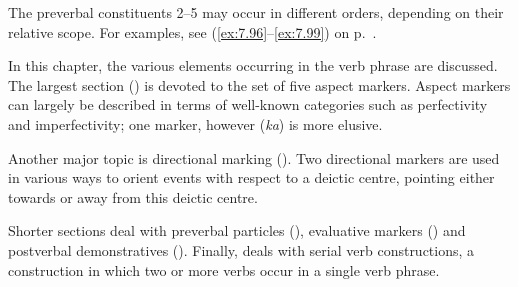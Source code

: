 \begin{table}
\caption{The verb phrase: postverbal elements}
\label{tab:45}
\end{table}
The preverbal constituents 2–5 may occur in different orders, depending on their relative scope. For examples, see (\ref{ex:7.96}–\ref{ex:7.99}) on p.~\pageref{ex:7.99}. 

In this chapter, the various elements occurring in the verb phrase are discussed. The largest section () is devoted to the set of five aspect markers. Aspect markers can largely be described in terms of well-known categories such as perfectivity and imperfectivity; one marker, however (\textit{ka}) is more elusive. 

Another major topic is directional marking (). Two directional markers are used in various ways to orient events with respect to a deictic centre, pointing either towards or away from this deictic centre.

Shorter sections deal with preverbal particles (), evaluative markers () and postverbal demonstratives (). Finally,  deals with serial verb constructions, a construction in which two or more verbs occur in a single verb phrase.


